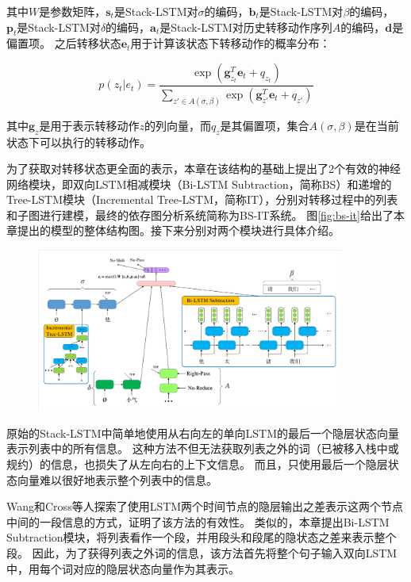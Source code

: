 其中$W$是参数矩阵，$\bm{s}_t$是Stack-LSTM对$\sigma$的编码，$\bm{b}_t$是Stack-LSTM对$\beta$的编码， $\bm{p}_t$是Stack-LSTM对$\delta$的编码，$\bm{a}_t$是Stack-LSTM对历史转移动作序列$A$的编码，$\bm{d}$是偏置项。
之后转移状态$\bm{e}_t$用于计算该状态下转移动作的概率分布：

\vspace{-0.6em}
\begin{equation}
	\label{eq:trans-softmax}
	p(z_t|e_t)=\frac{\exp(\bm{g}^T_{z_t}\bm{e}_t + q_{z_t})}{\sum_{z'\in A(\sigma, \beta)}\exp (\bm{g}^T_{z'}\bm{e}_t+q_{z'})}
\end{equation}

其中$\bm{g}_z$是用于表示转移动作$z$的列向量，而$q_z$是其偏置项，集合$A(\sigma,\beta)$是在当前状态下可以执行的转移动作。

为了获取对转移状态更全面的表示，本章在该结构的基础上提出了2个有效的神经网络模块，即双向LSTM相减模块（Bi-LSTM Subtraction，简称BS）和递增的Tree-LSTM模块（Incremental Tree-LSTM，简称IT），分别对转移过程中的列表和子图进行建模，最终的依存图分析系统简称为BS-IT系统。
图\ref{fig:bs-it}给出了本章提出的模型的整体结构图。接下来分别对两个模块进行具体介绍。

\begin{figure}[hbtp]
	\centering
	\includegraphics[width=0.9\textwidth]{figures/bs-it.pdf}
\end{figure}

原始的Stack-LSTM中简单地使用从右向左的单向LSTM的最后一个隐层状态向量表示列表中的所有信息。
这种方法不但无法获取列表之外的词（已被移入栈中或规约）的信息，也损失了从左向右的上下文信息。
而且，只使用最后一个隐层状态向量难以很好地表示整个列表中的信息。

Wang和Cross等人探索了使用LSTM两个时间节点的隐层输出之差表示这两个节点中间的一段信息的方式，证明了该方法的有效性。\cite{wang-chang-2016-graph,cross-huang-2016-span}
类似的，本章提出Bi-LSTM Subtraction模块，将列表看作一个段，并用段头和段尾的隐状态之差来表示整个段。
因此，为了获得列表之外词的信息，该方法首先将整个句子输入双向LSTM中，用每个词对应的隐层状态向量作为其表示。

